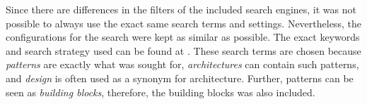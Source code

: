 \documentclass[a4paper,11pt,article,oneside]{memoir}
\begin{document}
Since there are differences in the filters of the included search engines, it was not possible to always use the exact same search terms and settings. Nevertheless, the configurations for the search were kept as similar as possible. The exact keywords and search strategy used can be found at \cite{SLRsearchTerms}. These search terms are chosen because \emph{patterns} are exactly what was sought for, \emph{architectures} can contain such patterns, and \emph{design} is often used as a synonym for architecture. Further, patterns can be seen as \emph{building blocks}, therefore, the building blocks was also included. 






 




        
\end{document}
